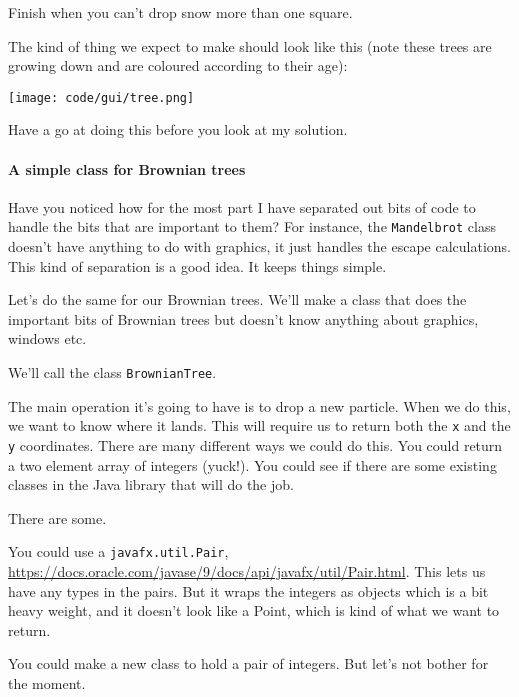 \documentclass{article}
\begin{document}
        Finish when you can’t drop snow more than one square.
        
        The kind of thing we expect to make should look like this (note these trees are growing down and are coloured according to their
        age):
        
        \texttt{[image: code/gui/tree.png]}

        Have a go at doing this before you look at my solution.
        
        \newpage
        \paragraph{A simple class for Brownian trees}
            Have you noticed how for the most part I have separated out bits of code to handle the bits that are important to them? For
            instance, the \texttt{Mandelbrot} class doesn't have anything to do with graphics, it just handles the escape calculations.
            This kind of separation is a good idea. It keeps things simple.
            
            Let's do the same for our Brownian trees. We'll make a class that does the important bits of Brownian trees but doesn't know
            anything about graphics, windows etc.
            
            We'll call the class \texttt{BrownianTree}. 
            
            The main operation it's going to have is to drop a new particle. When we do this, we want to know where it lands. This will
            require us to return both the \texttt{x} and the \texttt{y} coordinates. There are many different ways we could do this. You
            could return a two element array of integers (yuck!). You could see if there are some existing classes in the Java library that
            will do the job.
            
            There are some. 
            
            You could use a \texttt{javafx.util.Pair}, \url{https://docs.oracle.com/javase/9/docs/api/javafx/util/Pair.html}. This lets us
            have any types in the pairs. But it wraps the integers as objects which is a bit heavy weight, and it doesn't look like a
            Point, which is kind of what we want to return.
            
            You could make a new class to hold a pair of integers. But let's not bother for the moment.
            
\end{document}
